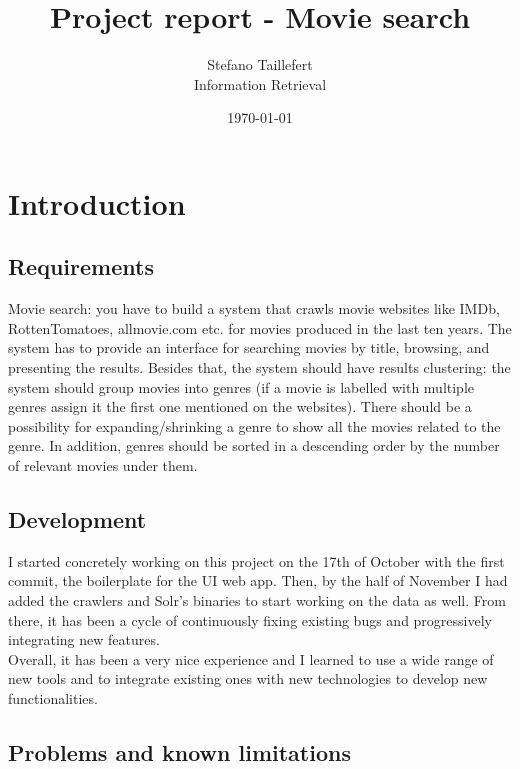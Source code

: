 \documentclass[12pt]{article}
\title{Project report - Movie search}
\author{Stefano Taillefert\\
Information Retrieval}
\date{\today}
\begin{document}
\maketitle

\tableofcontents

\newpage

\section{Introduction}

	\subsection{Requirements}
	
	Movie search: you have to build a system that crawls movie websites like IMDb, RottenTomatoes, allmovie.com etc. for movies produced in the last ten years. The system has to
provide an interface for searching movies by title, browsing, and presenting the results. Besides that, the system should have results clustering: the system should group movies into genres (if a movie is labelled with multiple genres assign it the first one mentioned on the websites). There should be a possibility for expanding/shrinking a genre to show all the movies related to the genre. In addition, genres should be sorted in a descending order by the number of relevant movies under them.
	
	\subsection{Development}
	
		I started concretely working on this project on the 17th of October with the first commit, the boilerplate for the UI web app. Then, by the half of November I had added the crawlers and Solr's binaries to start working on the data as well. From there, it has been a cycle of continuously fixing existing bugs and progressively integrating new features.\\
		
		Overall, it has been a very nice experience and I learned to use a wide range of new tools and to integrate existing ones with new technologies to develop new functionalities.
	
	\subsection{Problems and known limitations}
	
\end{document}
